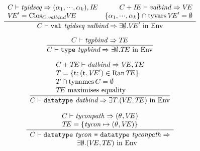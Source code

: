 

 \begin{equation}	%
 \label{valdec-rule}
 \frac{\begin{array}{lr}
       \C\ts\tyidseq\ra(\alpha_1,\cdots,\alpha_k),{\IE} &
       \plusmap{\C}{\IE}\ts\valbind\ra\VE \\
       \VE'=\cl{\C,\valbind}{\VE} & 
       \{\alpha_1,\cdots,\alpha_k\} \cap {\TyVarsFcn\VE'}=\emptyset
       \end{array}}
      {\C\ts\valdec\ra\EXISTS{\emptyset}{\VE'\ \In\ \Env}}\index{28.2}
 \end{equation}


\begin{equation}	%
\frac{\C\ts\typbind\ra\TE}
     {\C\ts\typedec\ra\EXISTS{\emptyset}{\TE\ \In\ \Env}}
\end{equation}

\begin{equation}	%
\label{datatypedec-rule}
\frac{\begin{array}{l}
      \C + \TE\ts\datbind\ra\VE,\TE \\
      \T = \{\t; (\t, \VE') \in\Ran\TE\} \\
      \T \cap \TyNamesFcn \C = \emptyset \\
      \mbox{$\TE$ maximises equality}
     \end{array}
     }
     {\C\ts\datatypedec\ra\EXISTS{\T}{(\VE,\TE)\ \In\ \Env}}
\end{equation}


\begin{equation}	%
\label{datatyperepdec-rule}
\frac{\begin{array}{c}
      \C\ts\tyconpath\ra(\typefnc,\VE) \\
      \TE = \{ \tycon\mapsto(\typefnc,\VE)\}
     \end{array}
     }
     {\begin{array}{c}
        \C\ts\datatyperepdec\ra\\
         \qquad\EXISTS{\emptyset}{(\VE,\TE)\ \In\ \Env}
      \end{array}}
\end{equation}

